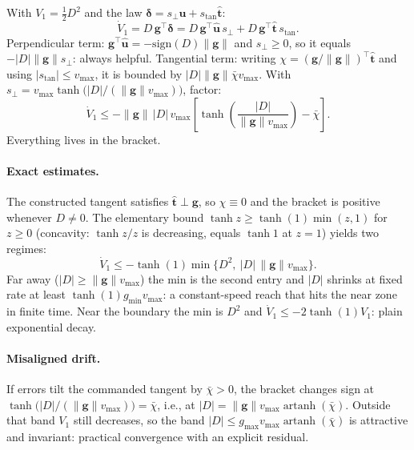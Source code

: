 \documentclass[11pt]{article}
\begin{document}
With $V_1 = \tfrac{1}{2}D^2$ and the law
$\boldsymbol{\delta} = s_\perp\hat{\mathbf{u}}
+ s_{\text{tan}}\hat{\mathbf{t}}$:
\begin{equation}
\dot{V}_1 = D\,\mathbf{g}^\top\boldsymbol{\delta}
= D\,\mathbf{g}^\top\hat{\mathbf{u}}\,s_\perp
+ D\,\mathbf{g}^\top\hat{\mathbf{t}}\,s_{\text{tan}} .
\end{equation}
Perpendicular term: $\mathbf{g}^\top\hat{\mathbf{u}}
= -\mathrm{sign}(D)\|\mathbf{g}\|$ and $s_\perp \geq 0$, so it equals
$-|D|\|\mathbf{g}\|s_\perp$: always helpful. Tangential term: writing
$\chi = (\mathbf{g}/\|\mathbf{g}\|)^\top\hat{\mathbf{t}}$ and using
$|s_{\text{tan}}| \leq v_{\max}$, it is bounded by
$|D|\|\mathbf{g}\|\bar{\chi}v_{\max}$. With
$s_\perp = v_{\max}\tanh\bigl(|D|/(\|\mathbf{g}\|v_{\max})\bigr)$, factor:
\begin{equation}
\dot{V}_1 \leq -\|\mathbf{g}\|\,|D|\,v_{\max}
\left[\tanh\!\left(\frac{|D|}{\|\mathbf{g}\|v_{\max}}\right)
- \bar{\chi}\right].
\end{equation}
Everything lives in the bracket.

\paragraph{Exact estimates.} The constructed tangent satisfies
$\hat{\mathbf{t}} \perp \mathbf{g}$, so $\chi \equiv 0$ and the bracket is
positive whenever $D \neq 0$. The elementary bound
$\tanh z \geq \tanh(1)\min(z, 1)$ for $z \geq 0$ (concavity: $\tanh z / z$
is decreasing, equals $\tanh 1$ at $z = 1$) yields two regimes:
\begin{equation}
\dot{V}_1 \leq -\tanh(1)\min\bigl\{D^2,\ |D|\,\|\mathbf{g}\|v_{\max}\bigr\}.
\end{equation}
Far away ($|D| \geq \|\mathbf{g}\|v_{\max}$) the min is the second entry
and $|D|$ shrinks at fixed rate at least $\tanh(1)g_{\min}v_{\max}$: a
constant-speed reach that hits the near zone in finite time. Near the
boundary the min is $D^2$ and $\dot{V}_1 \leq -2\tanh(1)V_1$: plain
exponential decay.

\paragraph{Misaligned drift.} If errors tilt the commanded tangent by
$\bar{\chi} > 0$, the bracket changes sign at
$\tanh\bigl(|D|/(\|\mathbf{g}\|v_{\max})\bigr) = \bar{\chi}$, i.e., at
$|D| = \|\mathbf{g}\|v_{\max}\operatorname{artanh}(\bar{\chi})$. Outside
that band $V_1$ still decreases, so the band
$|D| \leq g_{\max}v_{\max}\operatorname{artanh}(\bar{\chi})$ is attractive
and invariant: practical convergence with an explicit residual.
\end{document}
